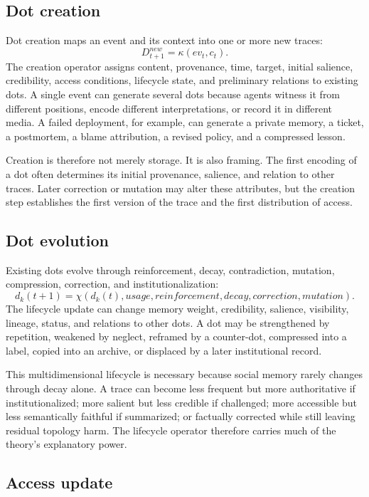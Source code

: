 \documentclass[11pt]{article}
\theoremstyle{remark}
\begin{document}
\subsection{Dot creation}\label{dot-creation}

Dot creation maps an event and its context into one or more new traces:
\[
D_{t+1}^{new}=\kappa(ev_t,c_t).
\]
The creation operator assigns content, provenance, time, target, initial salience, credibility, access conditions, lifecycle state, and preliminary relations to existing dots. A single event can generate several dots because agents witness it from different positions, encode different interpretations, or record it in different media. A failed deployment, for example, can generate a private memory, a ticket, a postmortem, a blame attribution, a revised policy, and a compressed lesson.

Creation is therefore not merely storage. It is also framing. The first encoding of a dot often determines its initial provenance, salience, and relation to other traces. Later correction or mutation may alter these attributes, but the creation step establishes the first version of the trace and the first distribution of access.

\subsection{Dot evolution}\label{dot-evolution}

Existing dots evolve through reinforcement, decay, contradiction, mutation, compression, correction, and institutionalization:
\[
d_k(t+1)=\chi(d_k(t),usage,reinforcement,decay,correction,mutation).
\]
The lifecycle update can change memory weight, credibility, salience, visibility, lineage, status, and relations to other dots. A dot may be strengthened by repetition, weakened by neglect, reframed by a counter-dot, compressed into a label, copied into an archive, or displaced by a later institutional record.

This multidimensional lifecycle is necessary because social memory rarely changes through decay alone. A trace can become less frequent but more authoritative if institutionalized; more salient but less credible if challenged; more accessible but less semantically faithful if summarized; or factually corrected while still leaving residual topology harm. The lifecycle operator therefore carries much of the theory's explanatory power.

\subsection{Access update}\label{access-update}
\end{document}
